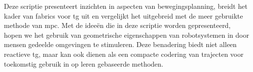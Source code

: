 Deze scriptie presenteert inzichten in aspecten van bewegingsplanning, breidt
het kader van \ac{fabrics} voor \ac{tg} uit en vergelijkt het uitgebreid met de
meer gebruikte methode van \ac{mpc}. Met de ideeën die in deze scriptie worden
gepresenteerd, hopen we het gebruik van geometrische eigenschappen van
robotsystemen in door mensen gedeelde omgevingen te stimuleren. Deze benadering
biedt niet alleen reactieve \ac{tg}, maar kan ook dienen als een compacte
codering van trajecten voor toekomstig gebruik in op leren gebaseerde methoden.
